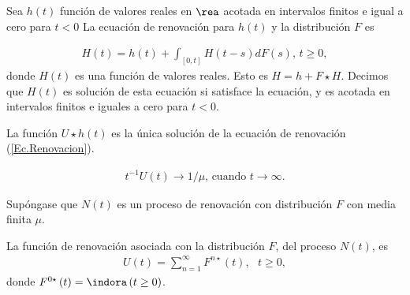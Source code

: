 %
%


\begin{Def}
Sea $h\left(t\right)$ funci\'on de valores reales en $\rea$ acotada en intervalos finitos e igual a cero para $t<0$ La ecuaci\'on de renovaci\'on para $h\left(t\right)$ y la distribuci\'on $F$ es

\begin{eqnarray}%
H\left(t\right)=h\left(t\right)+\int_{\left[0,t\right]}H\left(t-s\right)dF\left(s\right)\textrm{,    }t\geq0,
\end{eqnarray}
donde $H\left(t\right)$ es una funci\'on de valores reales. Esto es $H=h+F\star H$. Decimos que $H\left(t\right)$ es soluci\'on de esta ecuaci\'on si satisface la ecuaci\'on, y es acotada en intervalos finitos e iguales a cero para $t<0$.
\end{Def}

\begin{Prop}
La funci\'on $U\star h\left(t\right)$ es la \'unica soluci\'on de la ecuaci\'on de renovaci\'on (\ref{Ec.Renovacion}).
\end{Prop}

\begin{Teo}
\begin{eqnarray*}
t^{-1}U\left(t\right)\rightarrow 1/\mu\textrm{,    cuando }t\rightarrow\infty.
\end{eqnarray*}
\end{Teo}

%
%


Sup\'ongase que $N\left(t\right)$ es un proceso de renovaci\'on con distribuci\'on $F$ con media finita $\mu$.

\begin{Def}
La funci\'on de renovaci\'on asociada con la distribuci\'on $F$, del proceso $N\left(t\right)$, es
\begin{eqnarray*}
U\left(t\right)=\sum_{n=1}^{\infty}F^{n\star}\left(t\right),\textrm{   }t\geq0,
\end{eqnarray*}
donde $F^{0\star}\left(t\right)=\indora\left(t\geq0\right)$.
\end{Def}


